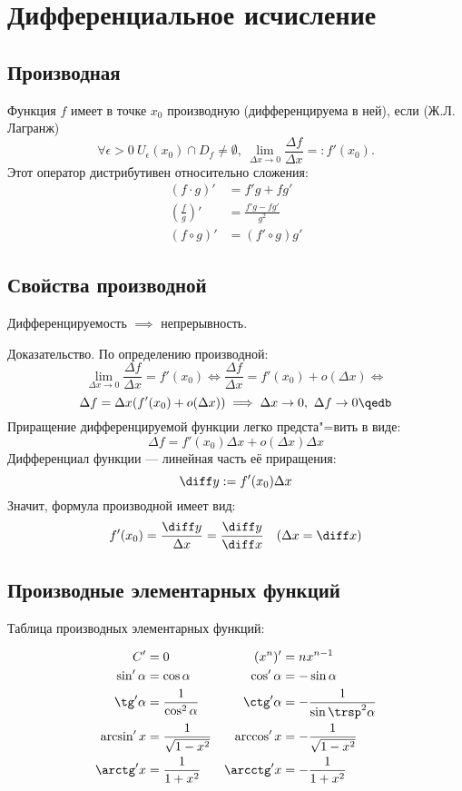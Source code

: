 \section{Дифференциальное исчисление}


\subsection{Производная}

Функция $f$ имеет в точке $x_0$ {\ital производную (дифференцируема в ней)}, если {\ital
\color{desc} (Ж.Л. Лагранж)}
$$\forall\epsilon\greater 0\ U_\epsilon(x_0)\cap D_f\neq\emptyset,\ \lim_{\Delta x\to 0}
\frac{\Delta f}{\Delta x}=:f'(x_0).$$
Этот оператор {\ital дистрибутивен} относительно {\ital сложения}:
\begin{align*}
(f\cdot g)'&=f'g+fg'\\
\left(\frac{f}{g}\right)'&=\frac{f'g-fg'}{g^2}\\
(f\circ g)'&=(f'\circ g)g'
\end{align*}

\subsection{Свойства производной}

Дифференцируемость $\implies$ непрерывность.

{\bold Доказательство.} По определению производной:
$$\lim_{\Delta x\to 0}\frac{\Delta f}{\Delta x}=f'(x_0)\iff \frac{\Delta f}{\Delta x}=
f'(x_0)+o(\Delta x)\iff$$
$$\Delta f=\Delta x(f'(x_0)+o(\Delta x))\implies\Delta x\to 0,\ \Delta f\to 0\qedb$$
Приращение дифференцируемой функции легко предста"=вить в виде:
$$\Delta f=f'(x_0)\Delta x+o(\Delta x)\Delta x$$
{\ital Дифференциал функции} --- линейная часть её приращения:
$$\diff y:=f'(x_0)\Delta x$$
Значит, формула производной имеет вид:
$$f'(x_0)=\frac{\diff y}{\Delta x}=\frac{\diff y}{\diff x}\quad(\Delta x=\diff x)$$

\newpage
\subsection{Производные элементарных функций}

Таблица производных элементарных функций:

\begin{align*}
C'&=0\quad\quad & (x^n)'&=nx^{n-1}\\
\sin'\alpha&=\cos\alpha & \cos'\alpha&=-\sin\alpha\\
\tg'\alpha&=\frac{1}{\cos^2\alpha} & \ctg'\alpha&=-\frac{1}{\sin\trsp^2\alpha}\\
\arcsin'x&=\frac{1}{\sqrt{1-x^2}} & \arccos'x&=-\frac{1}{\sqrt{1-x^2}}\\
\arctg'x&=\frac{1}{1+x^2} & \arcctg'x&=-\frac{1}{1+x^2}
\end{align*}

